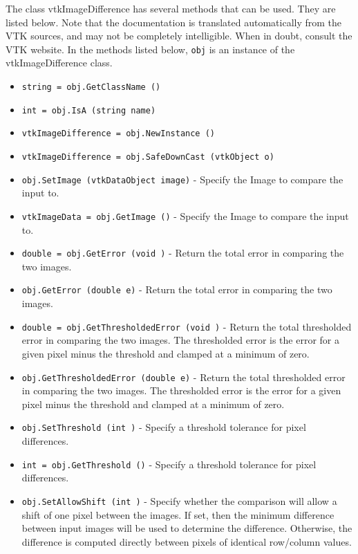 The class vtkImageDifference has several methods that can be used.
  They are listed below.
Note that the documentation is translated automatically from the VTK sources,
and may not be completely intelligible.  When in doubt, consult the VTK website.
In the methods listed below, \verb|obj| is an instance of the vtkImageDifference class.
\begin{itemize}
\item  \verb|string = obj.GetClassName ()|

\item  \verb|int = obj.IsA (string name)|

\item  \verb|vtkImageDifference = obj.NewInstance ()|

\item  \verb|vtkImageDifference = obj.SafeDownCast (vtkObject o)|

\item  \verb|obj.SetImage (vtkDataObject image)| -  Specify the Image to compare the input to.

\item  \verb|vtkImageData = obj.GetImage ()| -  Specify the Image to compare the input to.

\item  \verb|double = obj.GetError (void )| -  Return the total error in comparing the two images.

\item  \verb|obj.GetError (double e)| -  Return the total error in comparing the two images.

\item  \verb|double = obj.GetThresholdedError (void )| -  Return the total thresholded error in comparing the two images.
 The thresholded error is the error for a given pixel minus the
 threshold and clamped at a minimum of zero. 

\item  \verb|obj.GetThresholdedError (double e)| -  Return the total thresholded error in comparing the two images.
 The thresholded error is the error for a given pixel minus the
 threshold and clamped at a minimum of zero. 

\item  \verb|obj.SetThreshold (int )| -  Specify a threshold tolerance for pixel differences.

\item  \verb|int = obj.GetThreshold ()| -  Specify a threshold tolerance for pixel differences.

\item  \verb|obj.SetAllowShift (int )| -  Specify whether the comparison will allow a shift of one
 pixel between the images.  If set, then the minimum difference
 between input images will be used to determine the difference.
 Otherwise, the difference is computed directly between pixels
 of identical row/column values.


\end{itemize}
